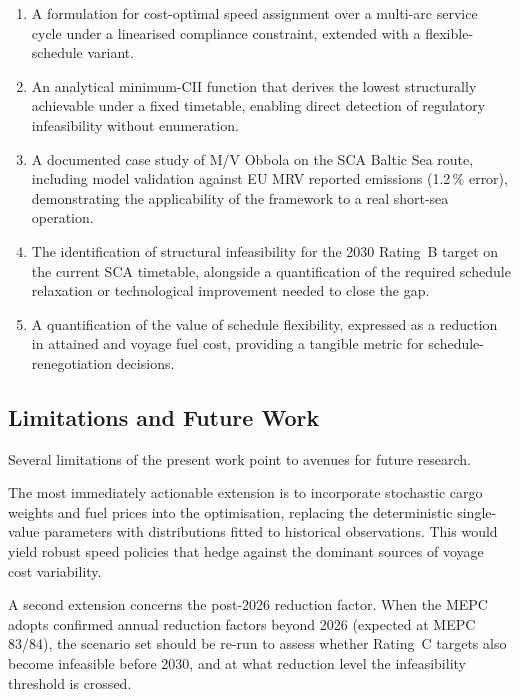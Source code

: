 \begin{enumerate}
  \item A \MILP{} formulation for cost-optimal speed assignment over a
    multi-arc \RoRo{} service cycle under a linearised \CII{} compliance
    constraint, extended with a flexible-schedule variant.

  \item An analytical minimum-CII function that derives the lowest
    structurally achievable \CII{} under a fixed timetable, enabling
    direct detection of regulatory infeasibility without enumeration.

  \item A documented case study of M/V Obbola on the SCA Baltic Sea
    route, including model validation against EU MRV reported emissions
    (1.2\,\% \CII{} error), demonstrating the applicability of the
    framework to a real short-sea \RoRo{} operation.

  \item The identification of structural \CII{} infeasibility for the
    2030 Rating~B target on the current SCA timetable, alongside a
    quantification of the required schedule relaxation or technological
    improvement needed to close the gap.

  \item A quantification of the value of schedule flexibility, expressed
    as a reduction in attained \CII{} and voyage fuel cost, providing
    a tangible metric for schedule-renegotiation decisions.
\end{enumerate}

\subsection{Limitations and Future Work}
\label{sec:conc:future}

Several limitations of the present work point to avenues for future
research.

The most immediately actionable extension is to incorporate stochastic
cargo weights and fuel prices into the optimisation, replacing the
deterministic single-value parameters with distributions fitted to
historical observations.  This would yield robust speed policies that
hedge against the dominant sources of voyage cost variability.

A second extension concerns the post-2026 reduction factor.  When the
\IMO{} MEPC adopts confirmed annual reduction factors beyond 2026
(expected at MEPC 83/84), the scenario set should be re-run to assess
whether Rating~C targets also become infeasible before 2030, and at
what reduction level the infeasibility threshold is crossed.


